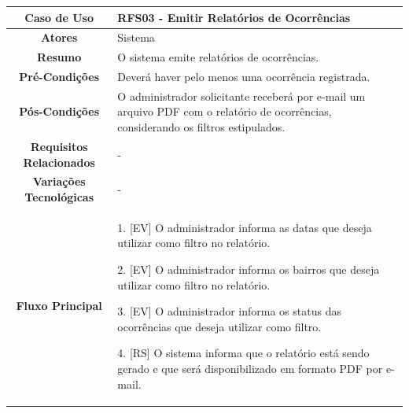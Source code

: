 \begin{apendicesenv}
\begin{quadro}[htb]
\end{quadro}

\begin{quadro}[htb]
	\centering
	\caption{\label{quadro_rfs03}Caso de Uso Emitir Relatórios de Ocorrências (Baixo Nível)}
	\small
	\renewcommand{\arraystretch}{1.1}
	
	\begin{tabular}{|c|p{11cm}|}
		\hline
		\textbf{Caso de Uso} & RFS03 - Emitir Relatórios de Ocorrências \\ \hline
		\textbf{Atores} & Sistema \\ \hline
		\textbf{Resumo} & O sistema emite relatórios de ocorrências. \\ \hline
		\textbf{Pré-Condições} & Deverá haver pelo menos uma ocorrência registrada. \\ \hline
		\textbf{Pós-Condições} & O administrador solicitante receberá por e-mail um arquivo PDF com o relatório de ocorrências, considerando os filtros estipulados. \\ \hline
		\textbf{Requisitos Relacionados} & - \\ \hline
		\textbf{Variações Tecnológicas} & - \\ \hline
		
		\textbf{Fluxo Principal} &
		\parbox[t]{11cm}{
			\raggedright
			1. [EV] O administrador informa as datas que deseja utilizar como filtro no relatório.\par
			2. [EV] O administrador informa os bairros que deseja utilizar como filtro no relatório.\par
			3. [EV] O administrador informa os status das ocorrências que deseja utilizar como filtro.\par
			4. [RS] O sistema informa que o relatório está sendo gerado e que será disponibilizado em formato PDF por e-mail.
		}
		\\ \hline
		
		\textbf{Tratamento de Exceções} &
		\parbox[t]{11cm}{
			\raggedright
			--
		}
		\\ \hline
	\end{tabular}
	
\end{quadro}
    
\end{apendicesenv}